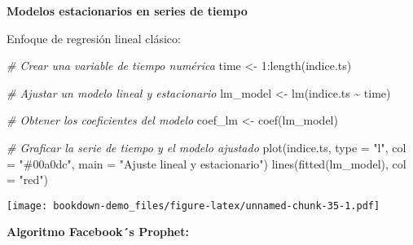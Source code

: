 \documentclass[
]{book}
\newenvironment{Shaded}{\begin{snugshade}}{\end{snugshade}}
\newcommand{\AttributeTok}[1]{\textcolor[rgb]{0.77,0.63,0.00}{#1}}
\newcommand{\CommentTok}[1]{\textcolor[rgb]{0.56,0.35,0.01}{\textit{#1}}}
\newcommand{\DecValTok}[1]{\textcolor[rgb]{0.00,0.00,0.81}{#1}}
\newcommand{\FunctionTok}[1]{\textcolor[rgb]{0.00,0.00,0.00}{#1}}
\newcommand{\NormalTok}[1]{#1}
\newcommand{\OtherTok}[1]{\textcolor[rgb]{0.56,0.35,0.01}{#1}}
\newcommand{\SpecialCharTok}[1]{\textcolor[rgb]{0.00,0.00,0.00}{#1}}
\newcommand{\StringTok}[1]{\textcolor[rgb]{0.31,0.60,0.02}{#1}}
\begin{document}
\textbf{Modelos estacionarios en series de tiempo}

Enfoque de regresión lineal clásico:

\begin{Shaded}
\begin{Highlighting}[]
\CommentTok{\# Crear una variable de tiempo numérica}
\NormalTok{time }\OtherTok{\textless{}{-}} \DecValTok{1}\SpecialCharTok{:}\FunctionTok{length}\NormalTok{(indice.ts)}

\CommentTok{\# Ajustar un modelo lineal y estacionario}
\NormalTok{lm\_model }\OtherTok{\textless{}{-}} \FunctionTok{lm}\NormalTok{(indice.ts }\SpecialCharTok{\textasciitilde{}}\NormalTok{ time)}

\CommentTok{\# Obtener los coeficientes del modelo}
\NormalTok{coef\_lm }\OtherTok{\textless{}{-}} \FunctionTok{coef}\NormalTok{(lm\_model)}

\CommentTok{\# Graficar la serie de tiempo y el modelo ajustado}
\FunctionTok{plot}\NormalTok{(indice.ts, }\AttributeTok{type =} \StringTok{"l"}\NormalTok{, }\AttributeTok{col =} \StringTok{"\#00a0dc"}\NormalTok{, }\AttributeTok{main =} \StringTok{"Ajuste lineal y estacionario"}\NormalTok{)}
\FunctionTok{lines}\NormalTok{(}\FunctionTok{fitted}\NormalTok{(lm\_model), }\AttributeTok{col =} \StringTok{"red"}\NormalTok{)}
\end{Highlighting}
\end{Shaded}

\texttt{[image: bookdown-demo\_files/figure-latex/unnamed-chunk-35-1.pdf]}

\textbf{Algoritmo Facebook´s Prophet:}

\begin{Shaded}
\end{Shaded}
\end{document}
